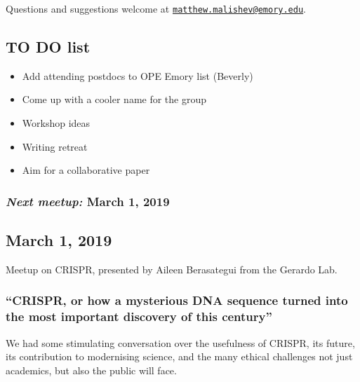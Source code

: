 \documentclass[10,portrait]{article}
\providecommand{\tightlist}{%
  \setlength{\itemsep}{0pt}\setlength{\parskip}{0pt}}
\begin{document}
Questions and suggestions welcome at
\href{mailto:matthew.malishev@emory.edu}{\nolinkurl{matthew.malishev@emory.edu}}.

\newpage  

\subsection{TO DO list}\label{to-do-list}

\begin{itemize}
\tightlist
\item
  Add attending postdocs to OPE Emory list (Beverly)\\
\item
  Come up with a cooler name for the group\\
\item
  Workshop ideas\\
\item
  Writing retreat\\
\item
  Aim for a collaborative paper
\end{itemize}

\subsubsection{\texorpdfstring{\emph{Next meetup:} March 1,
2019}{Next meetup: March 1, 2019}}\label{next-meetup-march-1-2019}

\newpage    

\subsection{March 1, 2019}\label{march-1-2019}

Meetup on CRISPR, presented by Aileen Berasategui from the Gerardo Lab.

\subsubsection{\texorpdfstring{``CRISPR, or how a mysterious DNA
sequence turned into the most important discovery of this
century''}{CRISPR, or how a mysterious DNA sequence turned into the most important discovery of this century}}\label{crispr-or-how-a-mysterious-dna-sequence-turned-into-the-most-important-discovery-of-this-century}

We had some stimulating conversation over the usefulness of CRISPR, its
future, its contribution to modernising science, and the many ethical
challenges not just academics, but also the public will face.
\end{document}
